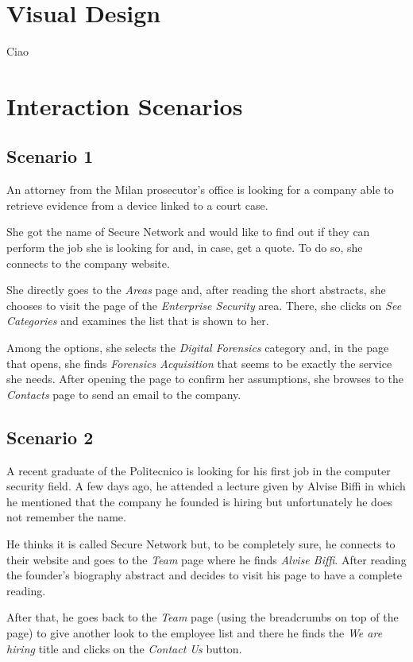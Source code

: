 \documentclass[12pt]{report}
\begin{document}
\chapter{Visual Design}
Ciao 
%

\chapter{Interaction Scenarios}

\section{Scenario 1}
An attorney from the Milan prosecutor's office is looking for a company able to retrieve evidence from a device linked to a court case.

She got the name of Secure Network and would like to find out if they can perform the job she is looking for and, in case, get a quote.
To do so, she connects to the company website.

She directly goes to the \emph{Areas} page and, after reading the short abstracts, she chooses to visit the page of the \emph{Enterprise Security} area.
There, she clicks on \emph{See Categories} and examines the list that is shown to her.

Among the options, she selects the \emph{Digital Forensics} category and, in the page that opens, she finds \emph{Forensics Acquisition} that seems to be exactly the service she needs.
After opening the page to confirm her assumptions, she browses to the \emph{Contacts} page to send an email to the company.

\section{Scenario 2}
A recent graduate of the Politecnico is looking for his first job in the computer security field.
A few days ago, he attended a lecture given by Alvise Biffi in which he mentioned that the company he founded is hiring but unfortunately he does not remember the name.

He thinks it is called Secure Network but, to be completely sure, he connects to their website and goes to the \emph{Team} page where he finds \emph{Alvise Biffi}.
After reading the founder's biography abstract and decides to visit his page to have a complete reading. 

After that, he goes back to the \emph{Team} page (using the breadcrumbs on top of the page) to give another look to the employee list and there he finds the \emph{We are hiring} title and clicks on the \emph{Contact Us} button.
\end{document}
